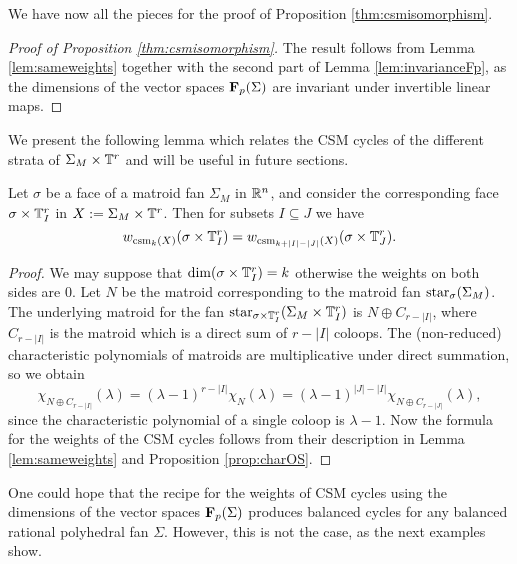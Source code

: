 We have now all the pieces for the proof of Proposition \ref{thm:csmisomorphism}.

\begin{proof}[Proof of Proposition \ref{thm:csmisomorphism}]
The result follows from Lemma \ref{lem:sameweights} together with the second part of Lemma \ref{lem:invarianceFp}, as the dimensions of the vector spaces ${\mathbf F}_p(\Sigma)$ are invariant under invertible linear maps. 
\end{proof}




We present the following lemma which relates the CSM cycles of the different strata of  $\Sigma_M \times \mathbb{T}^r$ and will be useful in future sections. 

\begin{lemma}\label{lem:csmtransbdy}
Let $\sigma$ be a face of a matroid fan $\Sigma_M$ in $\mathbb{R}^n$, and consider 
the corresponding face $\sigma \times \mathbb{T}^r_I$ in $X := \Sigma_M \times \mathbb{T}^r$. Then for subsets $I \subseteq J$ we have 
\[w_{\operatorname{csm}_k(X)}(\sigma \times \mathbb{T}^r_I) = w_ {\operatorname{csm}_{k + |I| -|J|} (X)}(\sigma \times \mathbb{T}^r_J).\] 
\end{lemma}

\begin{proof}
We may suppose that $\dim(\sigma \times \mathbb{T}^r_I) = k$ otherwise the weights on both sides are $0$.
Let $N$ be the matroid corresponding to the matroid fan $\operatorname{star}_{\sigma}(\Sigma_M)$.
The underlying matroid for the fan $\operatorname{star}_{\sigma \times \mathbb{T}^r_I}(\Sigma_M \times \mathbb{T}^r_I)$ is $N \oplus C_{r-|I|}$, where $C_{r-|I|}$ is the matroid which is a direct sum of $r - |I|$ coloops. 
The (non-reduced) characteristic polynomials of matroids  are multiplicative under direct summation, so we obtain
$$\chi_{N \oplus C_{r-|I|}} (\lambda) = (\lambda-1)^{r-|I|} \chi_N(\lambda)  = (\lambda-1)^{|J|-|I|} \chi_{N \oplus C_{r-|J|}} (\lambda),$$
since the characteristic polynomial of a single coloop is $\lambda-1$. 
Now the formula for the weights of the CSM cycles follows 
from their description in Lemma \ref{lem:sameweights} and Proposition \ref{prop:charOS}. 
\end{proof}



One could hope that the recipe for the weights of CSM cycles using the dimensions of the vector spaces ${\mathbf F}_p(\Sigma)$ produces balanced cycles for any balanced rational polyhedral fan $\Sigma$. However, this is not the case, as the next examples show. 
  
